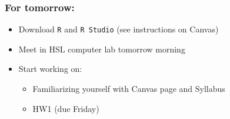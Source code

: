 \documentclass[12pt, 
hyperref={colorlinks=true, linkcolor=blue, urlcolor=cyan}]{beamer}
\begin{document}

\begin{frame}
\frametitle{For tomorrow:}

\begin{itemize}
\item Download \texttt{R} and \texttt{R Studio} (see instructions on Canvas)
\item Meet in HSL computer lab tomorrow morning
\item Start working on:
	\begin{itemize}
	\item Familiarizing yourself with Canvas page and Syllabus
	\item HW1 (due Friday)
	\end{itemize}
\end{itemize}

\end{frame}
\end{document}
